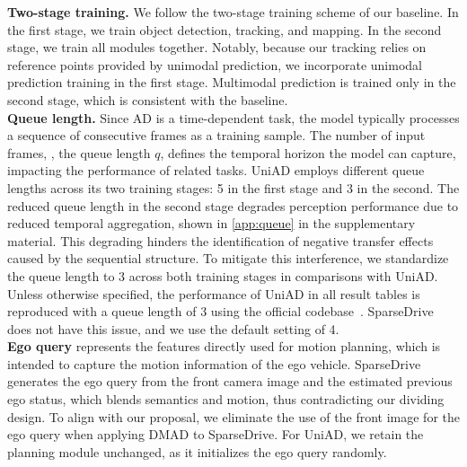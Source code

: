 \textbf{Two-stage training.} We follow the two-stage training scheme of our baseline. In the first stage, we train object detection, tracking, and mapping. In the second stage, we train all modules together. Notably, because our tracking relies on reference points provided by unimodal prediction, we incorporate unimodal prediction training in the first stage. Multimodal prediction is trained only in the second stage, which is consistent with the baseline.\\

\textbf{Queue length.} Since \gls{AD} is a time-dependent task, the model typically processes a sequence of consecutive frames as a training sample. The number of input frames, \ie, the queue length $q$, defines the temporal horizon the model can capture, impacting the performance of related tasks. UniAD employs different queue lengths across its two training stages: 5 in the first stage and 3 in the second. The reduced queue length in the second stage degrades perception performance due to reduced temporal aggregation, shown in \cref{app:queue} in the supplementary material.
This degrading hinders the identification of negative transfer effects caused by the sequential structure. To mitigate this interference, we standardize the queue length to 3 across both training stages in comparisons with UniAD. Unless otherwise specified, the performance of UniAD in all result tables is reproduced with a queue length of 3 using the official codebase~\cite{contributors2023_uniadrepo}. SparseDrive does not have this issue, and we use the default setting of 4. \\

\textbf{Ego query} represents the features directly used for motion planning, which is intended to capture the motion information of the ego vehicle. SparseDrive generates the ego query from the front camera image and the estimated previous ego status, which blends semantics and motion, thus contradicting our dividing design. To align with our proposal, we eliminate the use of the front image for the ego query when applying DMAD to SparseDrive. For UniAD, we retain the planning module unchanged, as it initializes the ego query randomly.


